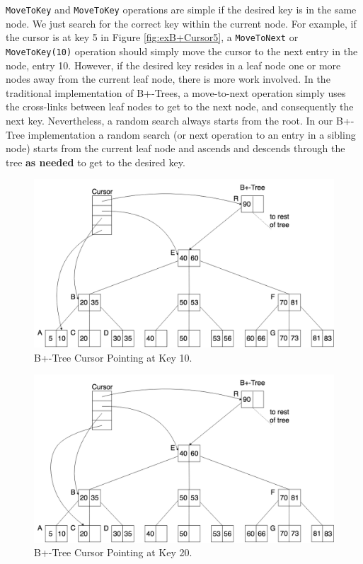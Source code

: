 \texttt{MoveToKey} and \texttt{MoveToKey} operations are simple if the desired key is in the same node. We just search for the correct key within the current node. For example, if the cursor is at key 5 in Figure \ref{fig:exB+Cursor5}, a \texttt{MoveToNext} or \texttt{MoveToKey(10)} operation should simply move the cursor to the next entry in the node, entry 10. However, if the desired key resides in a leaf node one or more nodes away from the current leaf node, there is more work involved. In the traditional implementation of B+-Trees, a move-to-next operation simply uses the cross-links between leaf nodes to get to the next node, and consequently the next key. Nevertheless, a random search always starts from the root. In our B+-Tree implementation a random search (or next operation to an entry in a sibling node) starts from the current leaf node and ascends and descends through the tree \textbf{as needed} to get to the desired key. 

\begin{figure}[h]
    \centering
    \includegraphics[scale=0.30]{figures/CursorAt10.png}
    \caption{B+-Tree Cursor Pointing at Key 10.}
    \label{fig:exB+Cursor10}
\end{figure}

\begin{figure}[h]
    \centering
    \includegraphics[scale=0.30]{figures/CursorAt20.png}
    \caption{B+-Tree Cursor Pointing at Key 20.}
    \label{fig:exB+Cursor20}
\end{figure}


